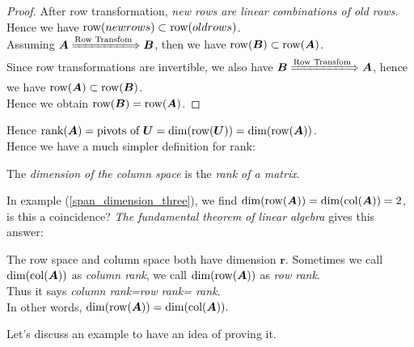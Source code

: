 \begin{proof}
After row transformation, \textit{new rows are linear combinations of old rows.} \\Hence we have $\operatorname{row}(new rows) \subset\operatorname{row}(old rows)$.\\
Assuming $\bm A\xLongrightarrow{\text{Row Transfom}}\bm B$, then we have $\operatorname{row}(\bm B)\subset\operatorname{row}(\bm A)$.\\
Since row transformations are invertible, we also have $\bm B\xLongrightarrow{\text{Row Transfom}}\bm A$, hence we have $\operatorname{row}(\bm A)\subset\operatorname{row}(\bm B)$.\\
Hence we obtain $\operatorname{row}(\bm B)=\operatorname{row}(\bm A)$.
\end{proof}
\newpage
Hence $\operatorname{rank}(\bm A) = \text{pivots of $\bm U$} = \dim(\operatorname{row}(\bm U)) = \dim(\operatorname{row}(\bm A))$.\\
Hence we have a much simpler definition for rank:
\begin{definition}[rank]
The \emph{dimension of the column space} is the \emph{rank of a matrix}.
\end{definition}
In example (\ref{span_dimension_three}), we find $\dim(\operatorname{row}(\bm A)) = \dim(\operatorname{col}(\bm A)) = 2$, is this a coincidence? \textit{The fundamental theorem of linear algebra} gives this answer:
\begin{theorem}\label{column_rank_row_rank}
The row space and column space both have dimension $\bm r$. Sometimes we call $\dim(\operatorname{col}(\bm A))$ as \textit{column rank}, we call $\dim(\operatorname{row}(\bm A))$ as \textit{row rank}. \\Thus it says \textit{column rank=row rank= rank}.\\
In other words, $\dim(\operatorname{row}(\bm A)) = \dim(\operatorname{col}(\bm A)).$
\end{theorem}
Let's discuss an example to have an idea of proving it.
